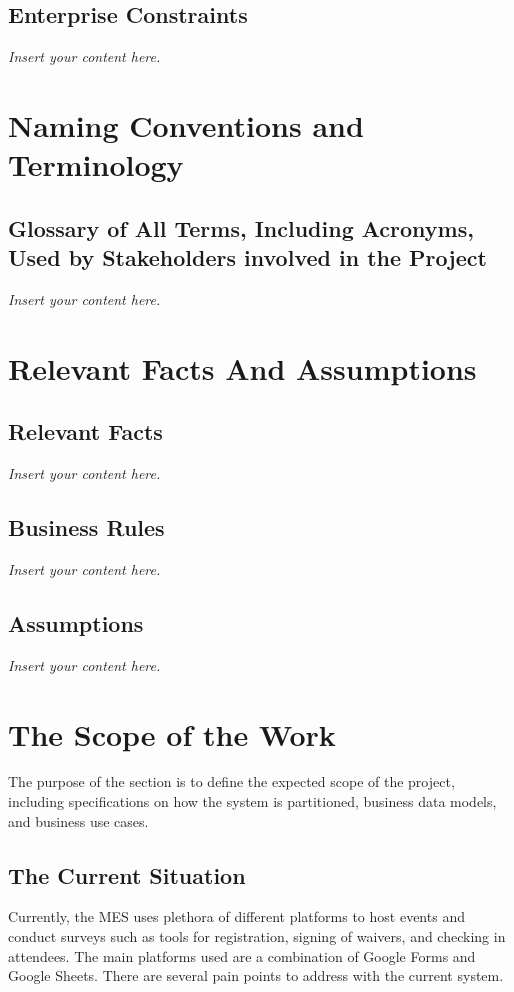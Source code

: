 \documentclass[12pt]{article}
\newcommand{\lips}{\textit{Insert your content here.}}
\begin{document}
\subsection{Enterprise Constraints}
\lips

\section{Naming Conventions and Terminology}
\subsection{Glossary of All Terms, Including Acronyms, Used by Stakeholders
involved in the Project}
\lips

\section{Relevant Facts And Assumptions}
\subsection{Relevant Facts}
\lips
\subsection{Business Rules}
\lips
\subsection{Assumptions}
\lips

\section{The Scope of the Work}

The purpose of the section is to define the expected scope of the project, including specifications on how the system is partitioned, business data models, and business use cases.

\subsection{The Current Situation}

Currently, the MES uses plethora of different platforms to host events and conduct surveys such as tools for registration, signing of waivers, and checking in attendees. The main platforms used are a combination of Google Forms and Google Sheets. There are several pain points to address with the current system.
\end{document}
